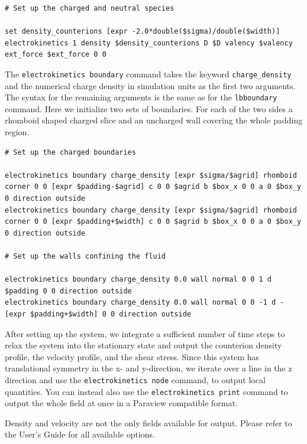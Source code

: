 \begin{lstlisting}[firstnumber=38]
# Set up the charged and neutral species

set density_counterions [expr -2.0*double($sigma)/double($width)]
electrokinetics 1 density $density_counterions D $D valency $valency ext_force $ext_force 0 0
\end{lstlisting}

The \texttt{electrokinetics boundary} command takes the keyword \texttt{charge\_density} and the numerical charge density in simulation units as the first two arguments. The syntax for the remaining arguments is the same as for the \texttt{lbboundary} command. Here we initialize two sets of boundaries. For each of the two sides a rhomboid shaped charged slice and an uncharged wall covering the whole padding region.

\begin{lstlisting}[firstnumber=43]
# Set up the charged boundaries

electrokinetics boundary charge_density [expr $sigma/$agrid] rhomboid corner 0 0 [expr $padding-$agrid] c 0 0 $agrid b $box_x 0 0 a 0 $box_y 0 direction outside
electrokinetics boundary charge_density [expr $sigma/$agrid] rhomboid corner 0 0 [expr $padding+$width] c 0 0 $agrid b $box_x 0 0 a 0 $box_y 0 direction outside

# Set up the walls confining the fluid

electrokinetics boundary charge_density 0.0 wall normal 0 0 1 d $padding 0 0 direction outside
electrokinetics boundary charge_density 0.0 wall normal 0 0 -1 d -[expr $padding+$width] 0 0 direction outside
\end{lstlisting}

After setting up the system, we integrate a sufficient number of time steps to relax the system into the stationary state and output the counterion density profile, the velocity profile, and the shear stress. Since this system has translational symmetry in the x- and y-direction, we iterate over a line in the z direction and use the \texttt{electrokinetics node} command, to output local quantities. You can instead also use the \texttt{electrokinetics print} command to output the whole field at once in a Paraview compatible format.

Density and velocity are not the only fields available for output. Please refer to the User's Guide for all available options.

